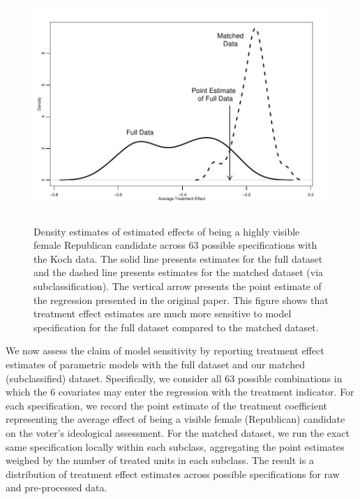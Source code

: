 \documentclass[11pt,letterpaper]{article}
\theoremstyle{plain}
\newcommand\spacingset[1]{\renewcommand{\baselinestretch}%
  {#1}\small\normalsize}
\begin{document}
\begin{figure}[t]
  \spacingset{1} 
  \begin{center}
    \includegraphics[height=3.5in,angle=0]{dens.pdf}
  \end{center}
  \vspace{-0.275in}
  \caption{Density estimates of estimated effects of being
    a highly visible female Republican candidate across 63 possible
    specifications with the Koch data.  The solid line presents
    estimates for the full dataset and the dashed line presents
    estimates for the matched dataset (via subclassification).  The
    vertical arrow presents the point estimate of the regression
    presented in the original paper.  This figure shows that treatment
    effect estimates are much more sensitive to model specification
    for the full dataset compared to the matched dataset.}
  \label{fg:kochdens}
\end{figure}

We now assess the claim of model sensitivity by reporting treatment
effect estimates of parametric models with the full dataset and our
matched (subclassified) dataset.  Specifically, we consider all 63
possible combinations in which the 6 covariates may enter the
regression with the treatment indicator.  For each specification, we record the point
estimate of the treatment coefficient representing the average effect
of being a visible female (Republican) candidate on the voter's
ideological assessment.  For the matched dataset, we run the exact
same specification locally within each subclass, aggregating the point
estimates weighed by the number of treated units in each subclass.
The result is a distribution of treatment effect estimates across
possible specifications for raw and pre-processed data.  
\end{document}

